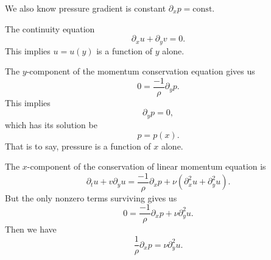 \begin{problem}[Poiseuille]
We also know pressure gradient is constant $\partial_{x}p=\mbox{const}$.
\end{problem}

\begin{node}
The continuity equation
\begin{equation}
\partial_{x}u+\partial_{y}v=0.
\end{equation}
This implies $u=u(y)$ is a function of $y$ alone.
\end{node}

\begin{node}
The $y$-component of the momentum conservation equation gives us
\begin{equation}
0=\frac{-1}{\rho}\partial_{y}p.
\end{equation}
This implies
\begin{equation}
\partial_{y}p=0,
\end{equation}
which has its solution be
\begin{equation}
p=p(x).
\end{equation}
That is to say, pressure is a function of $x$ alone.
\end{node}

\begin{node}
The $x$-component of the conservation of linear momentum equation is
\begin{equation}
\partial_{t}u+v\partial_{y}u=\frac{-1}{\rho}\partial_{x}p+\nu(\partial_{x}^{2}u+\partial_{y}^{2}u).
\end{equation}
But the only nonzero terms surviving gives us
\begin{equation}
0=\frac{-1}{\rho}\partial_{x}p+\nu\partial_{y}^{2}u.
\end{equation}
Then we have
\begin{equation}
\frac{1}{\rho}\partial_{x}p=\nu\partial_{y}^{2}u.
\end{equation}
\end{node}

